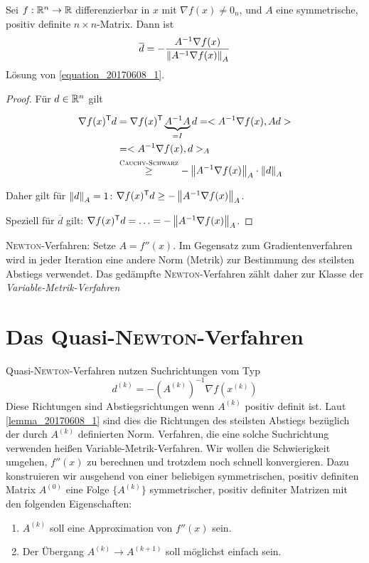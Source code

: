 \begin{Lemma}
 Sei $f: \mathbb R^n \rightarrow \mathbb R$ differenzierbar in $x$ mit $\nabla f(x) \neq 0_n$, und $A$ eine symmetrische, positiv definite $n \times n$-Matrix.
 Dann ist
 \[\overline{d} = -\frac{A^{-1} \nabla f(x)}{\left\lVert A^{-1} \nabla f(x)\right\rVert_A}\]
 Lösung von \autoref{equation_20170608_1}.
 \label{lemma_20170608_1}
\end{Lemma}

\begin{proof}
 Für $d \in \mathbb R^n$ gilt
 
 \begin{equation}
  \begin{aligned}
   \nabla f(x)^\mathsf{T} d &= \nabla f(x)^\mathsf{T} \underbrace{A^{-1}A}_{=I} d = <A^{-1}\nabla f(x), Ad>\\
   &= <A^{-1} \nabla f(x), d>_A\\
   &\overset{\text{\textsc{Cauchy}-\textsc{Schwarz}}}{\geq} -\left\lVert A^{-1} \nabla f(x)\right\rVert_A \cdot \left\lVert d\right\rVert_A
  \end{aligned}
 \end{equation}

 Daher gilt für $\left\lVert d\right\rVert_A = 1$: $\nabla f(x)^\mathsf{T} d \geq -\left\lVert A^{-1} \nabla f(x)\right\rVert_A$.
 
 Speziell für $\overline{d}$ gilt: $\nabla f(x)^\mathsf{T} d = \ldots = -\left\lVert A^{-1} \nabla f(x)\right\rVert_A$.
\end{proof}

\textsc{Newton}-Verfahren: Setze $A=f''(x)$. Im Gegensatz zum Gradientenverfahren wird in jeder Iteration eine andere Norm
(Metrik) zur Bestimmung des steilsten Abstiegs verwendet. Das gedämpfte \textsc{Newton}-Verfahren zählt daher zur Klasse der
\emph{Variable-Metrik-Verfahren}

\section{Das Quasi-\textsc{Newton}-Verfahren}
Quasi-\textsc{Newton}-Verfahren nutzen Suchrichtungen vom Typ
\[d^{(k)} = -(A^{(k)})^{-1} \nabla f(x^{(k)})\]
Diese Richtungen sind Abstiegsrichtungen wenn $A^{(k)}$ positiv definit ist.
Laut \autoref{lemma_20170608_1} sind dies die Richtungen des steilsten Abstiegs bezüglich der durch $A^{(k)}$ definierten Norm.
Verfahren, die eine solche Suchrichtung verwenden heißen Variable-Metrik-Verfahren.
Wir wollen die Schwierigkeit umgehen, $f''(x)$ zu berechnen und trotzdem noch \glqq schnell\grqq{} konvergieren.
Dazu konstruieren wir ausgehend von einer beliebigen symmetrischen, positiv definiten Matrix $A^{(0)}$ eine Folge $\{A^{(k)}\}$
symmetrischer, positiv definiter Matrizen mit den folgenden Eigenschaften:
\begin{enumerate}
 \item $A^{(k)}$ soll eine Approximation von $f''(x)$ sein.
 \item Der Übergang $A^{(k)} \rightarrow A^{(k+1)}$ soll möglichst einfach sein.
\end{enumerate}

